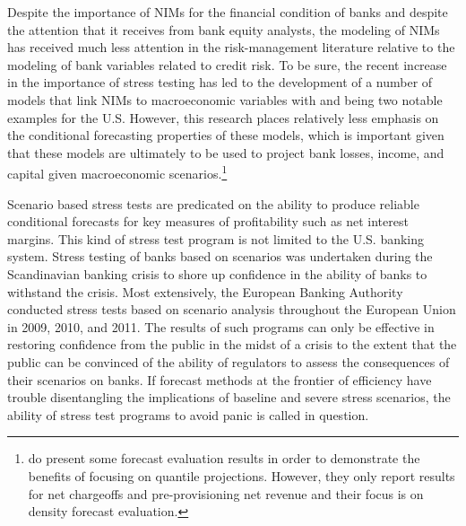 \documentclass[11pt]{article}
\renewcommand{\baselinestretch}{1.5}
\begin{document}
Despite the importance of NIMs for the financial condition of banks and despite the attention that it receives from bank equity analysts, the modeling of NIMs has received much less attention in the risk-management literature relative to the modeling of bank variables related to credit risk.  To be sure, the recent increase in the importance of stress testing has led to the development of a number of models that link NIMs to macroeconomic variables with  and  being two notable examples for the U.S.  However, this research places relatively less emphasis on the conditional forecasting properties of these models, which is important given that these models are ultimately to be used to project bank losses, income, and capital given macroeconomic scenarios.\renewcommand{\baselinestretch}{1}\footnote{ do present some forecast evaluation results in order to demonstrate the benefits of focusing on quantile projections. However, they only report results for net chargeoffs and pre-provisioning net revenue and their focus is on density forecast evaluation.\vspace{0.05in}}\renewcommand{\baselinestretch}{1.5}

Scenario based stress tests are predicated on the ability to produce reliable conditional forecasts for key measures of profitability such as net interest margins. This kind of stress test program is not limited to the U.S. banking system. Stress testing of banks based on scenarios was undertaken during the Scandinavian banking crisis to shore up confidence in the ability of banks to withstand the crisis. Most extensively, the European Banking Authority conducted stress tests based on scenario analysis throughout the European Union in 2009, 2010, and 2011. The results of such programs can only be effective in restoring confidence from the public in the midst of a crisis to the extent that the public can be convinced of the ability of regulators to assess the consequences of their scenarios on banks. If forecast methods at the frontier of efficiency have trouble disentangling the implications of baseline and severe stress scenarios, the ability of stress test programs to avoid panic is called in question.

\end{document}
